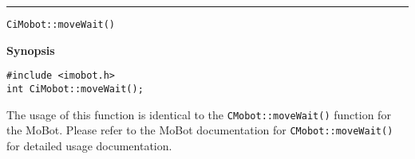 \noindent
\vspace{5pt}
\rule{6.5in}{0.015in}
\noindent
{\LARGE \texttt{CiMobot::moveWait()}}\\
{}

\noindent
{\bf Synopsis}\\
\begin{verbatim}
#include <imobot.h>
int CiMobot::moveWait();
\end{verbatim}

The usage of this function is identical to the
\texttt{CMobot::moveWait()} function for the MoBot.
Please refer to the MoBot documentation for \texttt{CMobot::moveWait()} for
detailed usage documentation.

